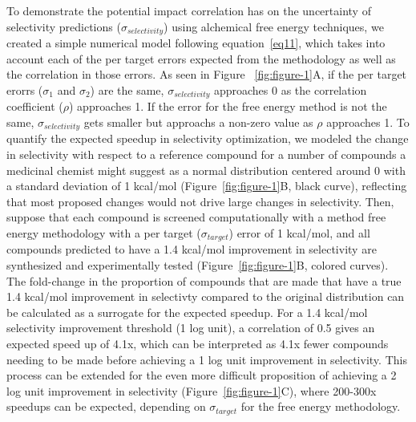 \documentclass[9pt,lineno]{elife-modified} %
\begin{document}
To demonstrate the potential impact correlation has on the uncertainty of selectivity predictions ($\sigma_{selectivity}$) using alchemical free energy techniques, we created a simple numerical model following equation~\ref{eq11}, which takes into account each of the per target errors expected from the methodology as well as the correlation in those errors. As seen in Figure ~\ref{fig:figure-1}A, if the per target erorrs ($\sigma_1$ and $\sigma_2$) are the same, $\sigma_{selectivity}$ approaches 0 as the correlation coefficient ($\rho$) approaches 1. If the error for the free energy method is not the same, $\sigma_{selectivity}$ gets smaller but approachs a non-zero value as $\rho$ approaches 1. 
To quantify the expected speedup in selectivity optimization, we modeled the change in selectivity with respect to a reference compound for a number of compounds a medicinal chemist might suggest as a normal distribution centered around 0 with a standard deviation of 1 kcal/mol (Figure~\ref{fig:figure-1}B, black curve), reflecting that most proposed changes would not drive large changes in selectivity. Then, suppose that each compound is screened computationally with a method free energy methodology with a per target ($\sigma_{target}$) error of 1 kcal/mol, and all compounds predicted to have a 1.4 kcal/mol improvement in selectivity are synthesized and experimentally tested (Figure~\ref{fig:figure-1}B, colored curves). The fold-change in the proportion of compounds that are made that have a true 1.4 kcal/mol improvement in selectivty compared to the original distribution can be calculated as a surrogate for the expected speedup. For a 1.4 kcal/mol selectivity improvement threshold (1 log unit), a correlation of 0.5 gives an expected speed up of 4.1x, which can be interpreted as 4.1x fewer compounds needing to be made before achieving a 1 log unit improvement in selectivity. This process can be extended for the even more difficult proposition of achieving a 2 log unit improvement in selectivity (Figure~\ref{fig:figure-1}C), where 200-300x speedups can be expected, depending on $\sigma_{target}$ for the free energy methodology. 
\end{document}
